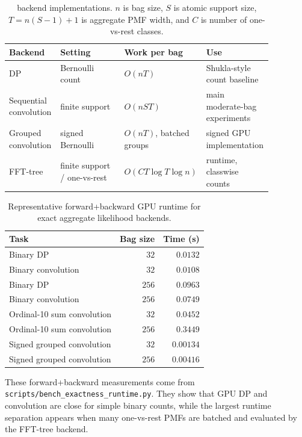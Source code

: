 \begin{table}[t]
\centering
\small
\caption{\method{} backend implementations.  $n$ is bag size, $S$ is atomic support size, $T=n(S-1)+1$ is aggregate PMF width, and $C$ is number of one-vs-rest classes.}
\label{tab:backends}
\begin{tabular}{p{0.18\linewidth}p{0.24\linewidth}p{0.20\linewidth}p{0.25\linewidth}}
\toprule
Backend & Setting & Work per bag & Use \\
\midrule
DP & Bernoulli count & $O(nT)$ & Shukla-style count baseline \\
Sequential convolution & finite support & $O(nST)$ & main moderate-bag experiments \\
Grouped convolution & signed Bernoulli & $O(nT)$, batched groups & signed GPU implementation \\
FFT-tree & finite support / one-vs-rest & $O(CT\log T\log n)$ & runtime, classwise counts \\
\bottomrule
\end{tabular}
\end{table}

\begin{table}[t]
\centering
\small
\caption{Representative forward+backward GPU runtime for exact aggregate likelihood backends.}
\label{tab:runtime-fwd-bwd}
\begin{tabular}{lrr}
\toprule
Task & Bag size & Time (s) \\
\midrule
Binary DP & $32$ & $0.0132$ \\
Binary convolution & $32$ & $0.0108$ \\
Binary DP & $256$ & $0.0963$ \\
Binary convolution & $256$ & $0.0749$ \\
Ordinal-10 sum convolution & $32$ & $0.0452$ \\
Ordinal-10 sum convolution & $256$ & $0.3449$ \\
Signed grouped convolution & $32$ & $0.00134$ \\
Signed grouped convolution & $256$ & $0.00416$ \\
\bottomrule
\end{tabular}
\end{table}

These forward+backward measurements come from \texttt{scripts/bench\_exactness\_runtime.py}.
They show that GPU DP and convolution are close for simple binary counts, while the largest runtime separation appears when many one-vs-rest PMFs are batched and evaluated by the FFT-tree backend.

